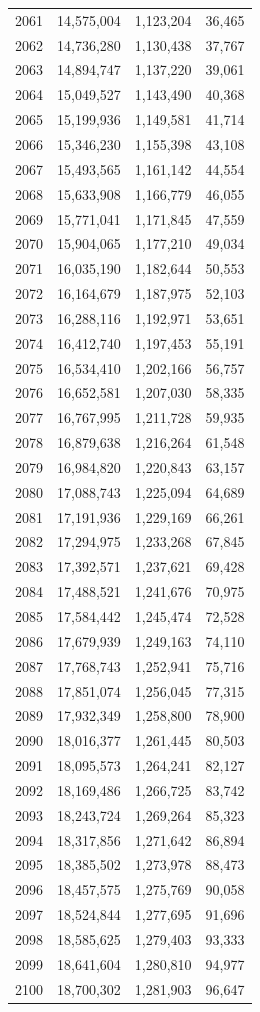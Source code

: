 \documentclass[11pt]{article}
\begin{document}
\begin{longtable}{@{}lrrr@{}}
2061 & 14,575,004 & 1,123,204 & 36,465\\
2062 & 14,736,280 & 1,130,438 & 37,767\\
2063 & 14,894,747 & 1,137,220 & 39,061\\
2064 & 15,049,527 & 1,143,490 & 40,368\\
2065 & 15,199,936 & 1,149,581 & 41,714\\
2066 & 15,346,230 & 1,155,398 & 43,108\\
2067 & 15,493,565 & 1,161,142 & 44,554\\
2068 & 15,633,908 & 1,166,779 & 46,055\\
2069 & 15,771,041 & 1,171,845 & 47,559\\
2070 & 15,904,065 & 1,177,210 & 49,034\\
2071 & 16,035,190 & 1,182,644 & 50,553\\
2072 & 16,164,679 & 1,187,975 & 52,103\\
2073 & 16,288,116 & 1,192,971 & 53,651\\
2074 & 16,412,740 & 1,197,453 & 55,191\\
2075 & 16,534,410 & 1,202,166 & 56,757\\
2076 & 16,652,581 & 1,207,030 & 58,335\\
2077 & 16,767,995 & 1,211,728 & 59,935\\
2078 & 16,879,638 & 1,216,264 & 61,548\\
2079 & 16,984,820 & 1,220,843 & 63,157\\
2080 & 17,088,743 & 1,225,094 & 64,689\\
2081 & 17,191,936 & 1,229,169 & 66,261\\
2082 & 17,294,975 & 1,233,268 & 67,845\\
2083 & 17,392,571 & 1,237,621 & 69,428\\
2084 & 17,488,521 & 1,241,676 & 70,975\\
2085 & 17,584,442 & 1,245,474 & 72,528\\
2086 & 17,679,939 & 1,249,163 & 74,110\\
2087 & 17,768,743 & 1,252,941 & 75,716\\
2088 & 17,851,074 & 1,256,045 & 77,315\\
2089 & 17,932,349 & 1,258,800 & 78,900\\
2090 & 18,016,377 & 1,261,445 & 80,503\\
2091 & 18,095,573 & 1,264,241 & 82,127\\
2092 & 18,169,486 & 1,266,725 & 83,742\\
2093 & 18,243,724 & 1,269,264 & 85,323\\
2094 & 18,317,856 & 1,271,642 & 86,894\\
2095 & 18,385,502 & 1,273,978 & 88,473\\
2096 & 18,457,575 & 1,275,769 & 90,058\\
2097 & 18,524,844 & 1,277,695 & 91,696\\
2098 & 18,585,625 & 1,279,403 & 93,333\\
2099 & 18,641,604 & 1,280,810 & 94,977\\
2100 & 18,700,302 & 1,281,903 & 96,647\\
\end{longtable}
\end{document}
